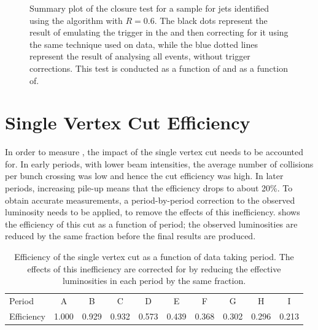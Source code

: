 \begin{figure}[htpb]
{    \label{fig:azimuthal-decorrelation:closure_Q0}}
  \caption{Summary plot of the closure test for a \dijet \MC sample for jets identified
           using the \akt algorithm with $R=0.6$. The black dots represent the result
           of emulating the trigger in the \MC and then correcting for it
           using the same technique used on data, while the blue dotted lines represent
           the result of analysing all events, without trigger corrections. This
           test is conducted \protect{} as
           a function of \DeltaY and \protect{}
           as a function of\Qnought.}
  \label{fig:azimuthal-decorrelation:closure}
\end{figure}

\section{Single Vertex Cut Efficiency}
In order to measure , the impact of the single vertex cut needs to be
accounted for. In early periods, with lower beam intensities, the average number
of collisions per bunch crossing was low and hence the cut efficiency was high.
In later periods, increasing pile-up means that the efficiency drops to about
20\%. To obtain accurate \xs measurements, a period-by-period correction to the
observed luminosity needs to be applied, to remove the effects of this
inefficiency.  shows the
efficiency of this cut as a function of period; the observed luminosities are
reduced by the same fraction before the final \xs results are produced.

\begin{table}
\begin{center}
  \begin{tabular}{ l c c c c c c c c c }
    Period     & A     & B     & C     & D     & E     & F     & G     & H     & I     \\
    Efficiency & 1.000 & 0.929 & 0.932 & 0.573 & 0.439 & 0.368 & 0.302 & 0.296 & 0.213 \\
   \end{tabular}
  \caption{Efficiency of the single vertex cut as a function of data taking
           period. The effects of this inefficiency are corrected for by
           reducing the effective luminosities in each period by the same
           fraction.}
  \label{tab:azimuthal-decorrelation:SVefficiencies}
\end{center}
\end{table}

